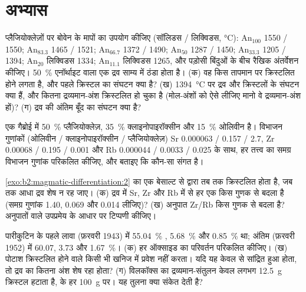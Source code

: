 \section{अभ्यास}

\begin{exercise}[$\star$]\label{exo:b2:magmatic-differentiation:1}
प्लैजियोक्लेज़ों पर बोवेन के मापों का उपयोग कीजिए (सॉलिडस / लिक्विडस, \unit{\celsius}):
An$_{100}$ 1550 / 1550; An$_{83.3}$ 1465 / 1521; An$_{66.7}$ 1372 / 1490; An$_{50}$
1287 / 1450; An$_{33.3}$ 1205 / 1394; An$_{20}$ लिक्विडस 1334; An$_{11.1}$ लिक्विडस
1265, और पड़ोसी बिंदुओं के बीच रैखिक अंतर्वेशन कीजिए। \qty{50}{\percent}
एनॉर्थाइट वाला एक द्रव साम्य में ठंडा होता है। (क) वह किस तापमान पर
क्रिस्टलित होने लगता है, और पहले क्रिस्टल का संघटन क्या है? (ख)
\qty{1394}{\celsius} पर द्रव और क्रिस्टलों के संघटन क्या हैं,
और कितना द्रव्यमान-अंश क्रिस्टलित हो चुका है (मोल-अंशों को ऐसे लीजिए मानो वे द्रव्यमान-अंश
हों)? (ग) द्रव की अंतिम बूँद का संघटन क्या है?
\end{exercise}

\begin{exercise}[$\star$]\label{exo:b2:magmatic-differentiation:2}
एक गैब्रोई  में \qty{50}{\percent} प्लैजियोक्लेज़, \qty{35}{\percent}
क्लाइनोपाइरॉक्सीन और \qty{15}{\percent} ओलिवीन है। विभाजन गुणांकों
(ओलिवीन / क्लाइनोपाइरॉक्सीन / प्लैजियोक्लेज़) Sr 0.000063 / 0.157 / 2.7, Zr 0.00068 /
0.195 / 0.001 और Rb 0.000044 / 0.0033 / 0.025 के साथ, हर तत्त्व का समग्र विभाजन
गुणांक परिकलित कीजिए, और बताइए कि कौन-सा संगत है।
\end{exercise}

\begin{exercise}[$\star$]\label{exo:b2:magmatic-differentiation:3}
\cref{exo:b2:magmatic-differentiation:2} का  एक बेसाल्ट से  द्वारा तब तक क्रिस्टलित होता है,
जब तक आधा द्रव शेष न रह जाए। (क) द्रव में Sr, Zr और Rb में से हर एक किस गुणक से बदला है
(समग्र गुणांक 1.40, 0.069 और 0.014 लीजिए)? (ख) अनुपात Zr/Rb किस गुणक से
बदला है? अनुपातों वाले उपप्रमेय के आधार पर टिप्पणी कीजिए।
\end{exercise}

\begin{exercise}[$\star$]\label{exo:b2:magmatic-differentiation:4}
पारीकुटिन के पहले लावा (फ़रवरी 1943) में \qty{55.04}{\percent} ,
\qty{5.68}{\percent}  और \qty{0.85}{\percent}  था; अंतिम (फ़रवरी
1952) में 60.07, 3.73 और \qty{1.67}{\percent}। (क) हर ऑक्साइड का परिवर्तन परिकलित कीजिए।
(ख) पोटाश क्रिस्टलित होने वाले किसी भी खनिज में प्रवेश नहीं करता। यदि यह केवल
 से सांद्रित हुआ होता, तो द्रव का कितना अंश शेष रहा होता?
(ग) विलकॉक्स का द्रव्यमान-संतुलन केवल लगभग \qty{12.5}{g} क्रिस्टल हटाता है,  के हर
\qty{100}{g} पर। यह तुलना क्या संकेत देती है?
\end{exercise}

